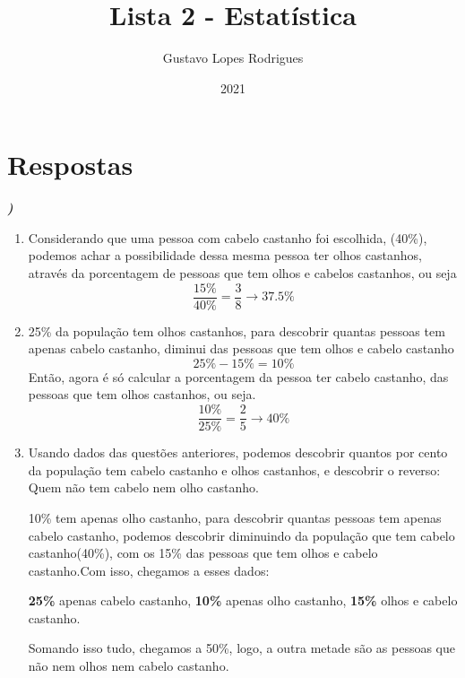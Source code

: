\documentclass[12pt]{article}
\title{\textbf{Lista 2 - Estatística}}
\author{Gustavo Lopes Rodrigues}
\date{2021}
\newcounter{instn}
\newcommand{\instnum}{\arabic{instn}}
\newcommand{\myline}[1]{
    \emph{\textbf{#1)}}
    \addtocounter{instn}{1}
}
\newenvironment{question}
 {
    \myline{\instnum} 
    }
    {
 }
\begin{document}
    
    \maketitle

    \section*{Respostas}


    \begin{question}
        \begin{enumerate}[label={\textbf{\alph*)}}]
            \item Considerando que uma pessoa com cabelo castanho foi escolhida,
            (40\%), podemos achar a possibilidade dessa mesma pessoa ter olhos castanhos,
            através da porcentagem de pessoas que tem olhos e cabelos castanhos, ou seja
            \begin{equation}
                \frac{15\%}{40\%} = \frac{3}{8} \rightarrow 37.5\%
            \end{equation}

            \item 25\% da população tem olhos castanhos, para descobrir quantas pessoas tem apenas 
            cabelo castanho, diminui das pessoas que tem olhos e cabelo castanho \[25\% - 15\% = 10\%\]
            Então, agora é só calcular a porcentagem da pessoa ter cabelo castanho, das pessoas que tem olhos
            castanhos, ou seja.
            \begin{equation}
                \frac{10\%}{25\%} = \frac{2}{5} \rightarrow 40\%
            \end{equation}

            \item Usando dados das questões anteriores, podemos descobrir quantos por cento da população 
            tem cabelo castanho e olhos castanhos, e descobrir o reverso: Quem não tem cabelo nem olho castanho.

            10\% tem apenas olho castanho, para descobrir quantas pessoas tem apenas cabelo castanho, 
            podemos descobrir diminuindo da população que tem cabelo castanho(40\%), com os 15\% das pessoas que tem
            olhos e cabelo castanho.Com isso, chegamos a esses dados: 
            \begin{center}
                \textbf{25\%} apenas cabelo castanho, \textbf{10\%} apenas olho castanho, \textbf{15\%} olhos e cabelo castanho. 
            \end{center}

            Somando isso tudo, chegamos a 50\%, logo, a outra metade são as pessoas que não nem olhos nem cabelo castanho.

        \end{enumerate}
    \end{question}
\end{document}
